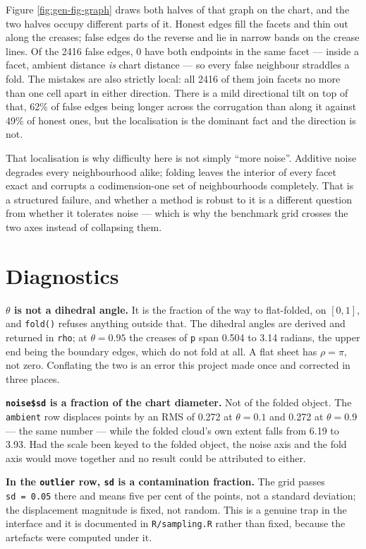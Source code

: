 \documentclass[
  british,
  a4paper,
]{book}
\begin{document}
Figure \ref{fig:gen-fig-graph} draws both halves of that graph on the chart, and
the two halves occupy different parts of it. Honest edges fill the facets and
thin out along the creases; false edges do the reverse and lie in narrow bands on
the crease lines. Of the 2416 false edges,
0 have both endpoints in the same facet --- inside a facet,
ambient distance \emph{is} chart distance --- so every false neighbour straddles a
fold. The mistakes are also strictly local: all
2416 of them join facets no more than one cell apart in
either direction. There is a mild directional tilt on top of that,
62\% of false edges being longer across the corrugation
than along it against 49\% of honest ones, but the
localisation is the dominant fact and the direction is not.

That localisation is why difficulty here is not simply ``more noise''. Additive
noise degrades every neighbourhood alike; folding leaves the interior of every
facet exact and corrupts a codimension-one set of neighbourhoods completely.
That is a structured failure, and whether a method is robust to it is a
different question from whether it tolerates noise --- which is why the benchmark
grid crosses the two axes instead of collapsing them.

\section{Diagnostics}\label{gen-diagnostics}

\textbf{\(\theta\) is not a dihedral angle.} It is the fraction of the way to
flat-folded, on \([0, 1]\), and \texttt{fold()} refuses anything outside that. The
dihedral angles are derived and returned in \texttt{rho}; at \(\theta = 0.95\) the
creases of \texttt{p} span 0.504 to
3.14 radians, the upper end being the boundary
edges, which do not fold at all. A flat sheet has \(\rho = \pi\), not zero.
Conflating the two is an error this project made once and corrected in three
places.

\textbf{\texttt{noise\$sd} is a fraction of the chart diameter.} Not of the folded object.
The \texttt{ambient} row displaces points by an RMS of
0.272 at \(\theta = 0.1\) and
0.272 at \(\theta = 0.9\) --- the
same number --- while the folded cloud's own extent falls from
6.19 to
3.93. Had the scale been keyed to
the folded object, the noise axis and the fold axis would move together and no
result could be attributed to either.

\textbf{In the \texttt{outlier} row, \texttt{sd} is a contamination fraction.} The grid passes
\texttt{sd\ =\ 0.05} there and means five per cent of the points, not a standard
deviation; the displacement magnitude is fixed, not random. This is a genuine
trap in the interface and it is documented in \texttt{R/sampling.R} rather than fixed,
because the artefacts were computed under it.
\end{document}
